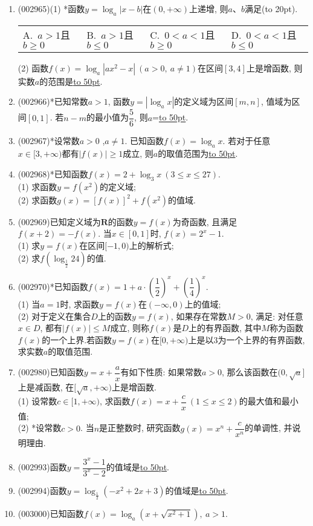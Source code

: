 \documentclass[10pt,a4paper]{article}
\newcommand{\blank}[1]{\underline{\hbox to #1pt{}}}
\newcommand{\bracket}[1]{(\hbox to #1pt{})}
\newcommand{\fourch}[4]{\par\begin{tabular}{p{.23\textwidth}p{.23\textwidth}p{.23\textwidth}p{.23\textwidth}}
A.~#1 &B.~#2& C.~#3& D.~#4
\end{tabular}}
\begin{document}
\begin{enumerate}[1.]
\\当$y=\ln x$时, 上述结论中, 正确结论的序号是\blank{50}.
\item {\tiny (002965)}(1) *函数$y=\log_a|x-b|$在$(0,+\infty)$上递增, 则$a$、$b$满足\bracket{20}.
\fourch{$a>1$且$b\ge 0$}{$a>1$且$b\le 0$}{$0<a<1$且$b\ge 0$}{$0<a<1$且$b\le 0$}
(2) 函数$f(x)=\log_a|ax^2-x| \ (a>0,\ a\ne 1)$在区间$[3,4]$上是增函数, 则实数$a$的范围是\blank{50}.
\item {\tiny (002966)}*已知常数$a>1$, 函数$y=|\log_ax|$的定义域为区间$[m,n]$, 值域为区间$[0,1]$. 若$n-m$的最小值为$\dfrac 56$, 则$a$=\blank{50}.
\item {\tiny (002967)}*设常数$a>0$ ,$a\ne 1$. 已知函数$f(x)=\log_ax$. 若对于任意$x\in [3,+\infty)$都有$|f(x)|\ge 1$成立, 则$a$的取值范围为\blank{50}.
\item {\tiny (002968)}*已知函数$f(x)=2+\log_3 x\ (3\le x\le 27)$.\\
(1) 求函数$y=f(x^2)$的定义域;\\
(2) 求函数$g(x)={[f(x)]}^2+f(x^2)$的值域.
\item {\tiny (002969)}已知定义域为$\mathbf{R}$的函数$y=f(x)$为奇函数, 且满足$f(x+2)=-f(x)$. 当$x\in [0,1]$时, $f(x)=2^x-1$.\\
(1) 求$y=f(x)$在区间$[-1,0)$上的解析式;\\
(2) 求$f(\log_{\frac 12}24)$的值.
\item {\tiny (002970)}*已知函数$f(x)=1+a\cdot (\dfrac 12)^x+(\dfrac 14)^x$.\\
(1) 当$a=1$时, 求函数$y=f(x)$在$(-\infty,0)$上的值域;\\
(2) 对于定义在集合$D$上的函数$y=f(x)$, 如果存在常数$M>0$, 满足: 对任意$x\in D$, 都有$|f(x)|\le M$成立, 则称$f(x)$是$D$上的有界函数, 其中$M$称为函数$f(x)$的一个上界.若函数$y=f(x)$在$[0,+\infty)$上是以$3$为一个上界的有界函数, 求实数$a$的取值范围.
\item {\tiny (002980)}已知函数$y=x+\dfrac ax$有如下性质: 如果常数$a>0$, 那么该函数在$(0, \sqrt a]$上是减函数, 在$[\sqrt a, +\infty)$上是增函数.\\
(1) 设常数$c\in [1,+\infty)$, 求函数$f(x)=x+\dfrac cx \ (1\le x\le 2)$的最大值和最小值;\\
(2) *设常数$c>0$. 当$n$是正整数时, 研究函数$g(x)=x^n+\dfrac c{x^n}$的单调性, 并说明理由.
\item {\tiny (002993)}函数$y=\dfrac{3^x-1}{3^x-2}$的值域是\blank{50}.
\item {\tiny (002994)}函数$y=\log_{\frac 12}(-x^2+2x+3)$的值域是\blank{50}.
\item {\tiny (003000)}已知函数$f(x)=\log_a(x+\sqrt{x^2+1}), \ a>1$.\\

\end{enumerate}
\end{document}
